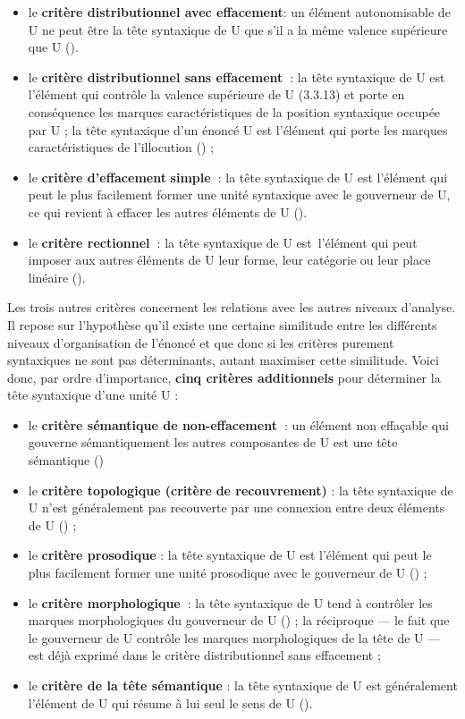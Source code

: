 \begin{itemize}
\item le \textbf{critère distributionnel avec effacement}: un élément autonomisable de U ne peut être la tête syntaxique de U que s’il a la même valence supérieure que U ().
\item le \textbf{critère distributionnel sans effacement~}: la tête syntaxique de U est l’élément qui contrôle la valence supérieure de U (3.3.13) et porte en conséquence les marques caractéristiques de la position syntaxique occupée par U ; la tête syntaxique d’un énoncé U est l’élément qui porte les marques caractéristiques de l’illocution () ;
\item le \textbf{critère d’effacement} \textbf{simple~}: la tête syntaxique de U est l’élément qui peut le plus facilement former une unité syntaxique avec le gouverneur de U, ce qui revient à effacer les autres éléments de U ().
\item le \textbf{critère rectionnel~}: la tête syntaxique de U est~l’élément qui peut imposer aux autres éléments de U leur forme, leur catégorie ou leur place linéaire ().
\end{itemize}

Les trois autres critères concernent les relations avec les autres niveaux d’analyse. Il repose sur l’hypothèse qu’il existe une certaine similitude entre les différents niveaux d’organisation de l’énoncé et que donc si les critères purement syntaxiques ne sont pas déterminants, autant maximiser cette similitude. Voici donc, par ordre d’importance, \textbf{cinq critères additionnels} pour déterminer la tête syntaxique d’une unité U :

\begin{itemize}
\item le \textbf{critère sémantique de non-effacement~}: un élément non effaçable qui gouverne sémantiquement les autres composantes de U est une tête sémantique ()
\item le \textbf{critère topologique (critère} \textbf{de recouvrement)} : la tête syntaxique de U n’est généralement pas recouverte par une connexion entre deux éléments de U () ;
\item le \textbf{critère prosodique} : la tête syntaxique de U est l’élément qui peut le plus facilement former une unité prosodique avec le gouverneur de U () ;
\item le \textbf{critère morphologique~}: la tête syntaxique de U tend à contrôler les marques morphologiques du gouverneur de U () ; la réciproque — le fait que le gouverneur de U contrôle les marques morphologiques de la tête de U — est déjà exprimé dans le critère distributionnel sans effacement ;
\item le \textbf{critère de la tête sémantique} : la tête syntaxique de U est généralement l’élément de U qui résume à lui seul le sens de U ().
\end{itemize}

